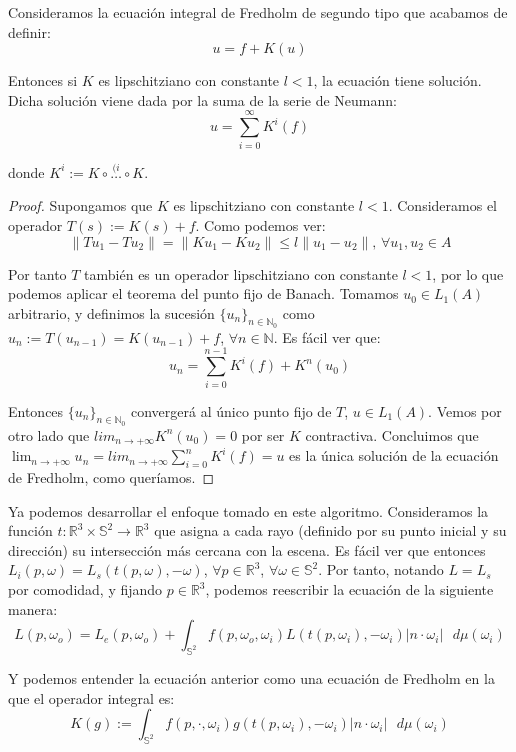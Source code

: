 \begin{teorema}\label{convergeFred}
  Consideramos la ecuación integral de Fredholm de segundo tipo que acabamos de definir:
  $$u = f+K(u) $$

  Entonces si $K$ es lipschitziano con constante $l<1$, la ecuación tiene solución. Dicha solución viene dada por la suma de la serie de Neumann:
  $$u=\sum_{i=0}^{\infty} K^i(f) $$

  donde $K^i:=K\circ \overset{(i}{\ldots}\circ K$.
  \end{teorema}
\begin{proof}
  Supongamos que $K$ es lipschitziano con constante $l<1$. Consideramos el operador $T(s):=K(s)+f$. Como podemos ver:
$$\|Tu_1-Tu_2\| = \|Ku_1-Ku_2\| \leq l\|u_1-u_2\|\text{, } \forall u_1,u_2\in A$$

  Por tanto $T$ también es un operador lipschitziano con constante $l<1$, por lo que podemos aplicar el teorema del punto fijo de Banach. Tomamos $u_0\in L_1(A)$ arbitrario, y definimos la sucesión $\{u_n\}_{n\in\mathds{N}_0}$ como $u_n := T(u_{n-1}) = K(u_{n-1})+f$, $\forall n\in\mathds{N}$. Es fácil ver que:
  $$u_n = \sum_{i=0}^{n-1}K^i(f) + K^n(u_0)$$

Entonces $\{u_n\}_{n\in\mathds{N}_0}$ convergerá al único punto fijo de $T$, $u\in L_1(A)$. Vemos por otro lado que $lim_{n\to +\infty}K^n(u_0) = 0$ por ser $K$ contractiva. Concluimos que $\lim_{n\to +\infty}u_n =lim_{n\to +\infty} \sum_{i=0}^{n}K^i(f) = u$ es la única solución de la ecuación de Fredholm, como queríamos.

  \end{proof}

Ya podemos desarrollar el enfoque tomado en este algoritmo. Consideramos la función $t:\mathds{R}^3\times \mathds{S}^2\rightarrow \mathds{R}^3$ que asigna a cada rayo (definido por su punto inicial y su dirección) su intersección más cercana con la escena. Es fácil ver que entonces $L_i(p,\omega) = L_s(t(p,\omega), -\omega)$, $\forall p\in\mathds{R}^3$, $\forall \omega\in\mathds{S}^2$. Por tanto, notando $L=L_s$ por comodidad, y fijando $p\in\mathds{R}^3$, podemos reescribir la ecuación de la siguiente manera:
\begin{equation}\label{rendEq2}
L(p,\omega _o) = L_e(p,\omega_o) + \int _{\mathds{S}^2}f(p,\omega _o, \omega _i) L(t(p,\omega_i), -\omega _i) |n\cdot \omega _i|\text{ }d\mu (\omega _i) 
\end{equation}

Y podemos entender la ecuación anterior como una ecuación de Fredholm en la que el operador integral es:
$$K(g) := \int _{\mathds{S}^2}f(p,\cdot, \omega _i) g(t(p,\omega_i), -\omega _i) |n\cdot \omega _i|\text{ }d\mu (\omega _i)$$

